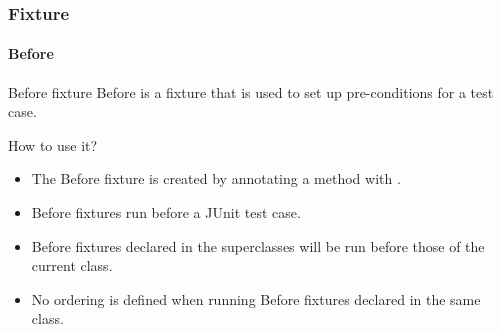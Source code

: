 \begin{frame}[parent={concept:fixture}, hasprev=false, hasnext=false]
\frametitle{Fixture}
\framesubtitle{Before}
\label{concept:junit-before-fixture}
\label{concept:before-fixture}
\label{concept:before}

\begin{block:concept}{Before fixture}
Before is a fixture that is used to set up pre-conditions for a test
case.
\end{block:concept}

\begin{block:fact}{How to use it?}
\begin{itemize}
	\item The Before fixture is created by annotating a method with
	.

	\item Before fixtures run before a JUnit test case.

	\item Before fixtures declared in the superclasses will be run before those
	of the current class.

	\item No ordering is defined when running Before fixtures declared in the
	same class.
\end{itemize}
\end{block:fact}
\end{frame}